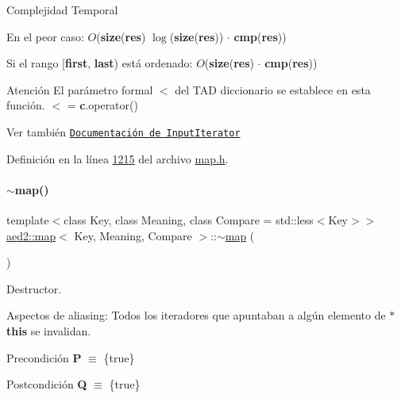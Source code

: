 \begin{DoxyDescription}
\item[Complejidad Temporal]
\begin{DoxyItemize}
\item En el peor caso\+: $O$({\bfseries size}({\bfseries res}) $\log$({\bfseries size}({\bfseries res})) $\cdot$ {\bfseries cmp}({\bfseries res}))
\item Si el rango \mbox{[}{\bfseries first}, {\bfseries last}) está ordenado\+: $O$({\bfseries size}({\bfseries res}) $\cdot$ {\bfseries cmp}({\bfseries res})) 
\end{DoxyItemize}
\end{DoxyDescription}

\begin{DoxyAttention}{Atención}
El parámetro formal $<$ del T\+AD diccionario se establece en esta función. $<$ = {\bfseries c}.operator()
\end{DoxyAttention}
\begin{DoxySeeAlso}{Ver también}
\href{http://en.cppreference.com/w/cpp/concept/InputIterator}{\tt Documentación de Input\+Iterator} 
\end{DoxySeeAlso}


Definición en la línea \hyperlink{map_8h_source_l01215}{1215} del archivo \hyperlink{map_8h_source}{map.\+h}.

\mbox{\label{classaed2_1_1map_ab22c9a85c2dadbc286cd30e97069a8e6_ab22c9a85c2dadbc286cd30e97069a8e6}} 
\paragraph{\texorpdfstring{$\sim$map()}{~map()}}
{\footnotesize\ttfamily template$<$class Key, class Meaning, class Compare = std\+::less$<$\+Key$>$$>$ \\
\hyperlink{classaed2_1_1map}{aed2\+::map}$<$ Key, Meaning, Compare $>$\+::$\sim$\hyperlink{classaed2_1_1map}{map} (\begin{DoxyParamCaption}{ }\end{DoxyParamCaption})\hspace{0.3cm}{\ttfamily [inline]}}



Destructor. 

\begin{DoxyParagraph}{Aspectos de aliasing\+:}
Todos los iteradores que apuntaban a algún elemento de {\bfseries $\ast$this} se invalidan.
\end{DoxyParagraph}
\begin{DoxyPrecond}{Precondición}
{\bfseries P} $\equiv$ \{true\} 
\end{DoxyPrecond}
\begin{DoxyPostcond}{Postcondición}
{\bfseries Q} $\equiv$ \{true\}
\end{DoxyPostcond}

